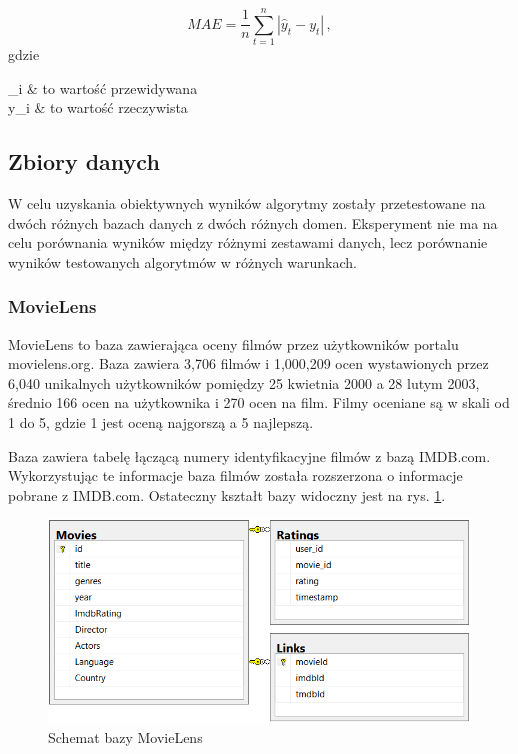 \documentclass[twoside]{iisthesis}
\begin{document}
		\begin{equation}
		\label{eq:mae}
		MAE = \frac{1}{n} \sum_{t=1}^{n} |\hat{y}_t - y_t|
		\,,
		\end{equation}		
		gdzie
		
		\begin{conditions*}
			_i & to wartość przewidywana \\
			y_i  &  to wartość rzeczywista
		\end{conditions*} 
	
	
		\subsection{Zbiory danych}
		
		W celu uzyskania obiektywnych wyników algorytmy zostały przetestowane na dwóch różnych bazach danych z dwóch różnych domen. Eksperyment nie ma na celu porównania wyników między różnymi zestawami danych, lecz porównanie wyników testowanych algorytmów w różnych warunkach. 
		
		\subsubsection{MovieLens}
		MovieLens \cite{harper2016movielens} to baza zawierająca oceny filmów przez użytkowników portalu movielens.org. Baza zawiera 3,706 filmów i 1,000,209 ocen wystawionych przez 6,040 unikalnych użytkowników pomiędzy 25 kwietnia 2000 a 28 lutym 2003, średnio 166 ocen na użytkownika i 270 ocen na film. Filmy oceniane są w skali od 1 do 5, gdzie 1 jest oceną najgorszą a 5 najlepszą. 
		
		Baza zawiera tabelę łączącą numery identyfikacyjne filmów z bazą IMDB.com. Wykorzystując te informacje baza filmów została rozszerzona o informacje pobrane z IMDB.com. Ostateczny kształt bazy widoczny jest na rys. \ref{fig:movielens_schema}.
		
			\begin{figure}[!ht] 
				\centering
				\includegraphics[width=1\textwidth]{movielens}
				\caption{Schemat bazy MovieLens}
				\label{fig:movielens_schema}
			\end{figure}
		
\end{document}
